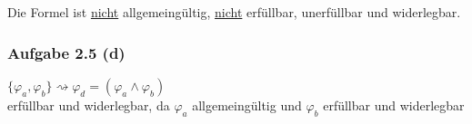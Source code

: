 Die Formel ist \underline{nicht} allgemeingültig, \underline{nicht} erfüllbar, unerfüllbar und widerlegbar.

\subsubsection{Aufgabe 2.5 (d)}
$\lbrace\varphi_a,\varphi_b\rbrace\rightsquigarrow\varphi_d=(\varphi_a\wedge\varphi_b)$\\
erfüllbar und widerlegbar, da $\varphi_a$ allgemeingültig und $\varphi_b$ erfüllbar und widerlegbar
